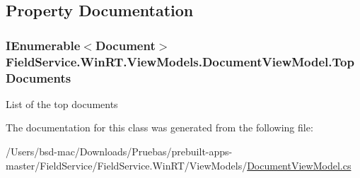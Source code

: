 \subsection{Property Documentation}
\hypertarget{class_field_service_1_1_win_r_t_1_1_view_models_1_1_document_view_model_a3447e34c86144bb37bc693742c34d2b3}{
\subsubsection[{Top\+Documents}]{\setlength{\rightskip}{0pt plus 5cm}I\+Enumerable$<${\bf Document}$>$ Field\+Service.\+Win\+R\+T.\+View\+Models.\+Document\+View\+Model.\+Top\+Documents\hspace{0.3cm}{\ttfamily [get]}}}\label{class_field_service_1_1_win_r_t_1_1_view_models_1_1_document_view_model_a3447e34c86144bb37bc693742c34d2b3}


List of the top documents 



The documentation for this class was generated from the following file\+:\begin{DoxyCompactItemize}
\item 
/\+Users/bsd-\/mac/\+Downloads/\+Pruebas/prebuilt-\/apps-\/master/\+Field\+Service/\+Field\+Service.\+Win\+R\+T/\+View\+Models/\hyperlink{_win_r_t_2_view_models_2_document_view_model_8cs}{Document\+View\+Model.\+cs}\end{DoxyCompactItemize}
